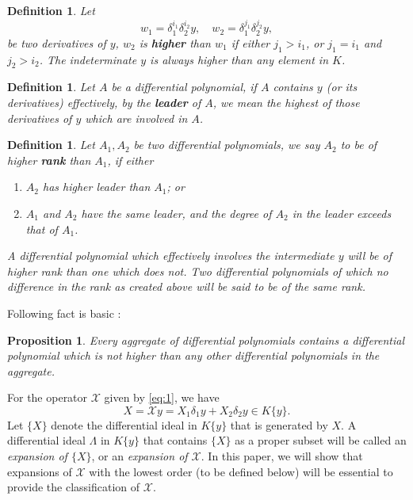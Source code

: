 \documentclass[preprint,12pt]{elsarticle}
\newtheorem{prop}[thm]{Proposition}
\newtheorem{defn}[thm]{Definition}
\begin{document}
\begin{defn}
Let
$$w_1= \delta_1^{i_1}\delta_2^{i_2}y,\quad w_2 = \delta_1^{j_1}\delta_2^{j_2}y,$$
be two derivatives of $y$, $w_2$ is \textbf{higher} than $w_1$ if either $j_1>i_1$, or $j_1 = i_1$ and $j_2  > i_2$. The indeterminate $y$ is always higher than any element in $K$.
\end{defn}

\begin{defn}
Let $A$ be a differential polynomial, if $A$ contains $y$ (or its derivatives) effectively,  by the \textbf{leader} of $A$, we mean the highest of those derivatives of $y$ which are involved in $A$.  
\end{defn}

\begin{defn}
Let $A_1, A_2$ be two differential polynomials, we say $A_2$ to be of higher \textbf{rank} than $A_1$, if either
\begin{enumerate}
\item[(1)] $A_2$ has higher leader than $A_1$; or
\item[(2)] $A_1$ and $A_2$ have the same leader, and the degree of $A_2$ in the leader exceeds that of $A_1$.
\end{enumerate}
A differential polynomial which effectively involves the intermediate $y$ will be of higher rank than one which does not.
Two differential polynomials of which no difference in the rank as created above will be said to be of the same rank.
\end{defn}

Following fact is basic \cite[pp.~3]{Ritt:50}:

\begin{prop}
\label{prop:1}
Every aggregate of differential polynomials contains a differential polynomial which is not higher than any other differential polynomials in the aggregate.
\end{prop}

For the operator $\mathscr{X}$ given by \eqref{eq:1}, we have 
\begin{equation}
\label{eq:5}
X= \mathscr{X}y = X_1 \delta_1y+X_2\delta_2y\in K\{y\}.
\end{equation}
Let $\{X\}$ denote the differential ideal in $K\{y\}$ that is generated by $X$.  A differential ideal $\Lambda$ in $K\{y\}$ that contains $\{X\}$ as a proper subset will be called an \textit{expansion of $\{X\}$}, or an \textit{expansion of $\mathscr{X}$}.  In this paper, we will show that expansions of $\mathscr{X}$ with the lowest order (to be defined below) will be essential to provide the classification of $\mathscr{X}$.  
\end{document}
